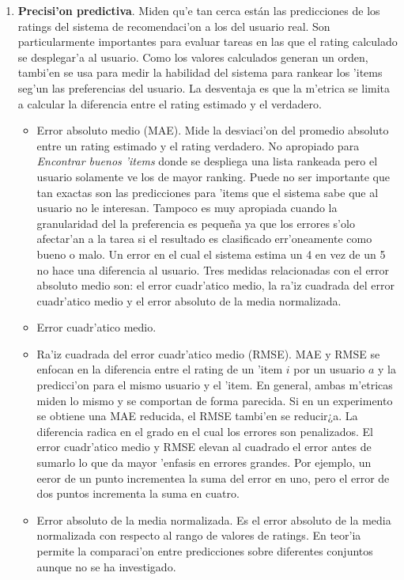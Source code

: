 \documentclass[11pt]{article}
\begin{document}
\begin{enumerate}
\item \textbf{Precisi'on predictiva}. Miden qu'e tan cerca están las predicciones de los ratings del sistema de recomendaci'on a los del usuario real. Son particularmente importantes para evaluar tareas en las que el rating calculado se desplegar'a al usuario. Como los valores calculados generan un orden, tambi'en se usa para medir la habilidad del sistema para rankear los 'items seg'un las preferencias del usuario. La desventaja es que la m'etrica se limita a calcular la diferencia entre el rating estimado y el verdadero.

	\begin{itemize}
	\item Error absoluto medio (MAE). Mide la desviaci'on del promedio absoluto entre un rating estimado y el rating verdadero. No apropiado para \textit{Encontrar buenos 'items} donde se despliega una lista rankeada pero el usuario solamente ve los de mayor ranking. Puede no ser importante que tan exactas son las predicciones para 'items que el sistema sabe que al usuario no le interesan. Tampoco es muy apropiada cuando la granularidad del la preferencia es peque\~{n}a ya que los errores s'olo afectar'an a la tarea si el resultado es clasificado err'oneamente como bueno o malo. Un error en el cual el sistema estima un 4 en vez de un 5 no hace una diferencia al usuario. Tres medidas relacionadas con el error absoluto medio son: el error cuadr'atico medio, la ra'iz cuadrada del error cuadr'atico medio y el error absoluto de la media normalizada.
	\item Error cuadr'atico medio.
	\item Ra'iz cuadrada del error cuadr'atico medio (RMSE). 
	MAE y RMSE se enfocan en la diferencia entre el rating de un 'item $i$ por un usuario $a$ y la predicci'on para el mismo usuario y el 'item. En general, ambas m'etricas miden lo mismo y se comportan de forma parecida. Si en un experimento se obtiene una MAE reducida, el RMSE tambi'en se reducir¿a. La diferencia radica en el grado en el cual los errores son penalizados.
	El error cuadr'atico medio y RMSE elevan al cuadrado el error antes de sumarlo lo que da mayor 'enfasis en errores grandes. Por ejemplo, un eeror de un punto incrementea la suma del error en uno, pero el error de dos puntos incrementa la suma en cuatro. 
	\item Error absoluto de la media normalizada.  Es el error absoluto de la media normalizada con respecto al rango de valores de ratings. En teor'ia permite la comparaci'on entre predicciones sobre diferentes conjuntos aunque no se ha investigado.
	\end{itemize}


\end{enumerate}
\end{document}
